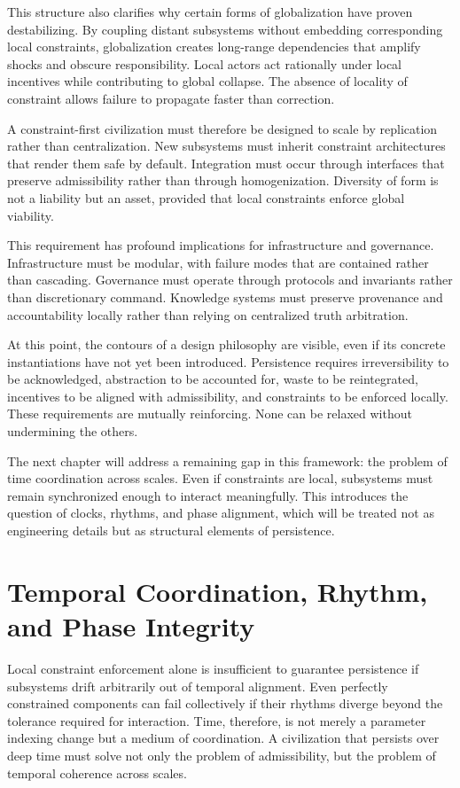 \documentclass[12pt,oneside]{book}
\begin{document}
This structure also clarifies why certain forms of globalization have proven destabilizing. By coupling distant subsystems without embedding corresponding local constraints, globalization creates long-range dependencies that amplify shocks and obscure responsibility. Local actors act rationally under local incentives while contributing to global collapse. The absence of locality of constraint allows failure to propagate faster than correction.

A constraint-first civilization must therefore be designed to scale by replication rather than centralization. New subsystems must inherit constraint architectures that render them safe by default. Integration must occur through interfaces that preserve admissibility rather than through homogenization. Diversity of form is not a liability but an asset, provided that local constraints enforce global viability.

This requirement has profound implications for infrastructure and governance. Infrastructure must be modular, with failure modes that are contained rather than cascading. Governance must operate through protocols and invariants rather than discretionary command. Knowledge systems must preserve provenance and accountability locally rather than relying on centralized truth arbitration.

At this point, the contours of a design philosophy are visible, even if its concrete instantiations have not yet been introduced. Persistence requires irreversibility to be acknowledged, abstraction to be accounted for, waste to be reintegrated, incentives to be aligned with admissibility, and constraints to be enforced locally. These requirements are mutually reinforcing. None can be relaxed without undermining the others.

The next chapter will address a remaining gap in this framework: the problem of time coordination across scales. Even if constraints are local, subsystems must remain synchronized enough to interact meaningfully. This introduces the question of clocks, rhythms, and phase alignment, which will be treated not as engineering details but as structural elements of persistence.

\chapter{Temporal Coordination, Rhythm, and Phase Integrity}

Local constraint enforcement alone is insufficient to guarantee persistence if subsystems drift arbitrarily out of temporal alignment. Even perfectly constrained components can fail collectively if their rhythms diverge beyond the tolerance required for interaction. Time, therefore, is not merely a parameter indexing change but a medium of coordination. A civilization that persists over deep time must solve not only the problem of admissibility, but the problem of temporal coherence across scales.
\end{document}
